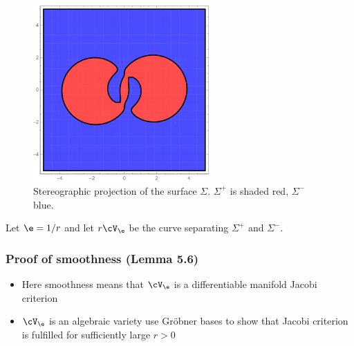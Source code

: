 \begin{frame}
  \begin{figure}
    \centering
    \includegraphics[width=0.6\textwidth]{../plots/n3_hf_inflowOutflow_Ball_Surface_2.pdf}
    \caption{Stereographic projection of the surface $\Sigma$. $\Sigma^+$ is shaded red, $\Sigma^-$ blue.}
    \label{pl:n3_hf_inflowOutflowStagnationPoint_Surface}
  \end{figure}
\end{frame}

%   

\begin{frame}
  Let $\e=1/r$ and
  let $r\cV_\e$ be the curve separating $\Sigma^+$ and $\Sigma^-$. 
  \begin{figure}
    \centering
    \resizebox{\textwidth}{!}{
      
    }
  \end{figure}
\end{frame}

\begin{frame}
  \frametitle{Proof of smoothness (Lemma 5.6)}
  \begin{itemize}
    \item Here smoothness means that $\cV_\e$ is a differentiable manifold \textrightarrow Jacobi criterion
    \item $\cV_\e$ is an algebraic variety \textrightarrow use Gröbner bases to show that Jacobi criterion is fulfilled for sufficiently large $r>0$
  \end{itemize}
\end{frame}


